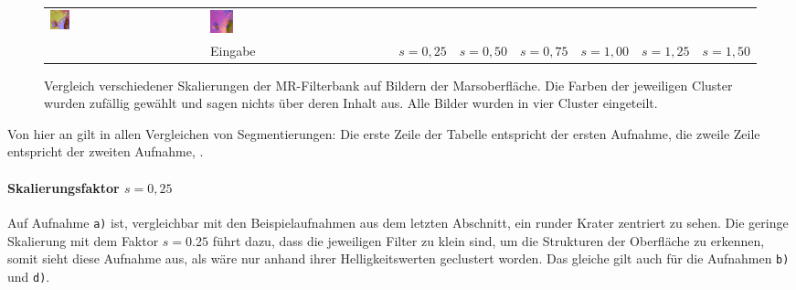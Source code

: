 \begin{figure}[h!]
\begin{tabular}{m{15pt}m{}m{}m{}m{}m{}m{}m{}}
		\includegraphics[width=0.13\textwidth]{images/gen/filter_size/p03_04.png_1.25.png} &
		\includegraphics[width=0.13\textwidth]{images/gen/filter_size/p03_04.png_1.50.png} \\
		
		&
		\vspace*{2pt}\centering Eingabe & 
		\vspace*{2pt}\centering $s=0,25$ &
		\vspace*{2pt}\centering $s=0,50$ &
		\vspace*{2pt}\centering $s=0,75$ &
		\vspace*{2pt}\centering $s=1,00$ &
		\vspace*{2pt}\centering $s=1,25$ &
		\vspace*{2pt}\centering $s=1,50$
	\end{tabular}
	\caption{Vergleich verschiedener Skalierungen der MR-Filterbank auf Bildern der Marsoberfläche. Die Farben der jeweiligen Cluster wurden zufällig gewählt und sagen nichts über deren Inhalt aus. Alle Bilder wurden in vier Cluster eingeteilt.}
	\label{fig:filterbank_sizes}
\end{figure}

Von hier an gilt in allen Vergleichen von Segmentierungen: Die erste Zeile der Tabelle entspricht der ersten Aufnahme, die zweile Zeile entspricht der zweiten Aufnahme, \etc.

\paragraph{Skalierungsfaktor $s=0,25$}

Auf Aufnahme \texttt{a)} ist, vergleichbar mit den Beispielaufnahmen aus dem letzten Abschnitt, ein runder Krater zentriert zu sehen. Die geringe Skalierung mit dem Faktor $s=0.25$ führt dazu, dass die jeweiligen Filter zu klein sind, um die Strukturen der Oberfläche zu erkennen, somit sieht diese Aufnahme aus, als wäre nur anhand ihrer Helligkeitswerten geclustert worden. Das gleiche gilt auch für die Aufnahmen \texttt{b)} und \texttt{d)}.

